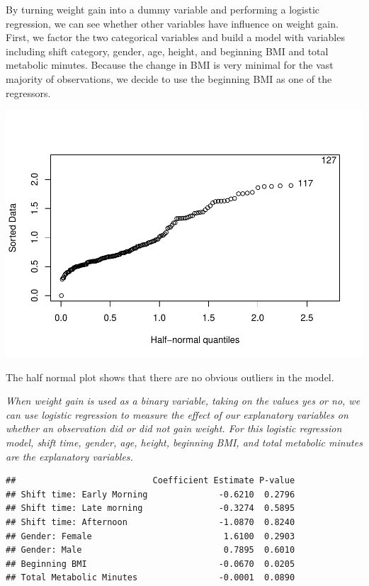 \documentclass[]{article}
\begin{document}
By turning weight gain into a dummy variable and performing a logistic
regression, we can see whether other variables have influence on weight
gain. First, we factor the two categorical variables and build a model
with variables including shift category, gender, age, height, and
beginning BMI and total metabolic minutes. Because the change in BMI is
very minimal for the vast majority of observations, we decide to use the
beginning BMI as one of the regressors.

\includegraphics{Practicum-1-Technical-Report_v2_files/figure-latex/unnamed-chunk-6-1.pdf}

The half normal plot shows that there are no obvious outliers in the
model.

\emph{When weight gain is used as a binary variable, taking on the
values yes or no, we can use logistic regression to measure the effect
of our explanatory variables on whether an observation did or did not
gain weight. For this logistic regression model, shift time, gender,
age, height, beginning BMI, and total metabolic minutes are the
explanatory variables.}

\begin{verbatim}
##                           Coefficient Estimate P-value
## Shift time: Early Morning              -0.6210  0.2796
## Shift time: Late morning               -0.3274  0.5895
## Shift time: Afternoon                  -1.0870  0.8240
## Gender: Female                          1.6100  0.2903
## Gender: Male                            0.7895  0.6010
## Beginning BMI                          -0.0670  0.0205
## Total Metabolic Minutes                -0.0001  0.0890
\end{verbatim}
\end{document}

